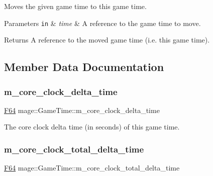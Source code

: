 Moves the given game time to this game time.


\begin{DoxyParams}[1]{Parameters}
\mbox{\tt in}  & {\em time} & A reference to the game time to move. \\
\hline
\end{DoxyParams}
\begin{DoxyReturn}{Returns}
A reference to the moved game time (i.\+e. this game time). 
\end{DoxyReturn}


\subsection{Member Data Documentation}
\hypertarget{classmage_1_1_game_time_abe875fff075fa87e4d029221f84b9f35}{}\label{classmage_1_1_game_time_abe875fff075fa87e4d029221f84b9f35} 
\subsubsection{\texorpdfstring{m\+\_\+core\+\_\+clock\+\_\+delta\+\_\+time}{m\_core\_clock\_delta\_time}}
{\footnotesize\ttfamily \hyperlink{namespacemage_ad26233bbec640deda836e572c1a23708}{F64} mage\+::\+Game\+Time\+::m\+\_\+core\+\_\+clock\+\_\+delta\+\_\+time\hspace{0.3cm}{\ttfamily [private]}}

The core clock delta time (in seconds) of this game time. \hypertarget{classmage_1_1_game_time_ad030e0d01cfdfb3080caa74142cd6775}{}\label{classmage_1_1_game_time_ad030e0d01cfdfb3080caa74142cd6775} 
\subsubsection{\texorpdfstring{m\+\_\+core\+\_\+clock\+\_\+total\+\_\+delta\+\_\+time}{m\_core\_clock\_total\_delta\_time}}
{\footnotesize\ttfamily \hyperlink{namespacemage_ad26233bbec640deda836e572c1a23708}{F64} mage\+::\+Game\+Time\+::m\+\_\+core\+\_\+clock\+\_\+total\+\_\+delta\+\_\+time\hspace{0.3cm}{\ttfamily [private]}}

